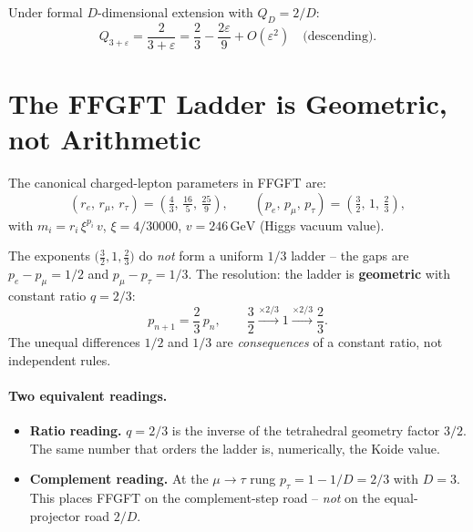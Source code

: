 Under formal \(D\)-dimensional extension with \(Q_D = 2/D\):
\begin{equation}
  Q_{3+\varepsilon} = \frac{2}{3+\varepsilon}
  = \frac{2}{3} - \frac{2\varepsilon}{9} + O(\varepsilon^2)
  \quad \text{(descending)}.
\end{equation}

\section{The FFGFT Ladder is Geometric, not Arithmetic}
\label{sec:ladder}

The canonical charged-lepton parameters in FFGFT
\cite{Pascher2026,PascherDok006} are:
\begin{equation}
  (r_e,\, r_\mu,\, r_\tau) = \left(\tfrac{4}{3},\, \tfrac{16}{5},\, \tfrac{25}{9}\right),
  \qquad
  (p_e,\, p_\mu,\, p_\tau) = \left(\tfrac{3}{2},\, 1,\, \tfrac{2}{3}\right),
\end{equation}
with \(m_i = r_i\,\xi^{p_i}\,v\), \(\xi = 4/30000\),
\(v = 246\,\text{GeV}\) (Higgs vacuum value).

The exponents \(\bigl(\tfrac{3}{2}, 1, \tfrac{2}{3}\bigr)\) do
\emph{not} form a uniform \(1/3\) ladder -- the gaps are
\(p_e - p_\mu = 1/2\) and \(p_\mu - p_\tau = 1/3\).
The resolution: the ladder is \textbf{geometric} with constant ratio
\(q = 2/3\):
\begin{equation}
  p_{n+1} = \frac{2}{3}\,p_n, \qquad
  \frac{3}{2} \xrightarrow{\times 2/3} 1 \xrightarrow{\times 2/3} \frac{2}{3}.
\end{equation}
The unequal differences \(1/2\) and \(1/3\) are \emph{consequences} of a
constant ratio, not independent rules.

\paragraph{Two equivalent readings.}
\begin{itemize}
  \item \textbf{Ratio reading.} \(q = 2/3\) is the inverse of the
        tetrahedral geometry factor \(3/2\). The same number that orders
        the ladder is, numerically, the Koide value.
  \item \textbf{Complement reading.} At the \(\mu\to\tau\) rung
        \(p_\tau = 1 - 1/D = 2/3\) with \(D=3\).
        This places FFGFT on the complement-step road --
        \emph{not} on the equal-projector road \(2/D\).
\end{itemize}

